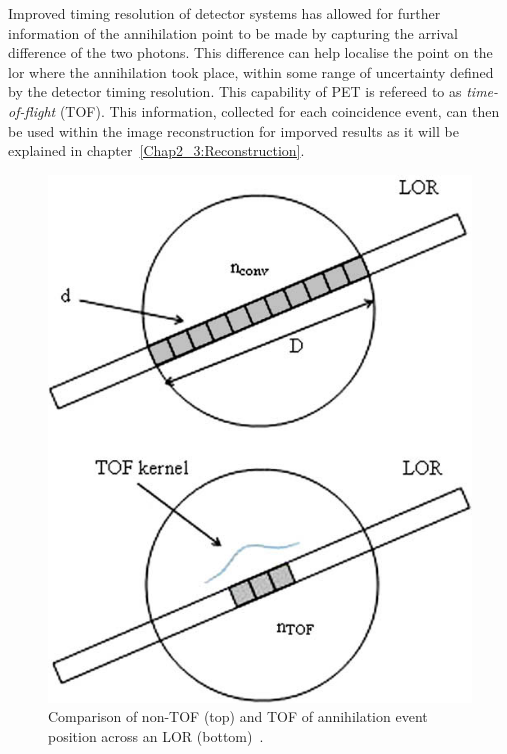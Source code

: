 Improved timing resolution of detector systems has allowed for further information of the annihilation point to be made by capturing the arrival difference of the two photons. This difference can help localise the point on the \gls{lor} where the annihilation took place, within some range of uncertainty defined by the detector timing resolution. This capability of PET is refereed to as \textit{time-of-flight} (TOF).
This information, collected for each coincidence event, can then be used within the image reconstruction for imporved results as it will be explained in chapter~\ref{Chap2_3:Reconstruction}.
%
%
\begin{figure} [h!]
\centering
\includegraphics[scale=0.55,angle=0]{2_Theory_Methods/figures/TOF_bin.png}
\caption{Comparison of non-TOF (top) and TOF of annihilation event position across an LOR (bottom)~\cite{Conti2009}.} 
\label{fig_2:TOF_bin}
\end{figure} 
